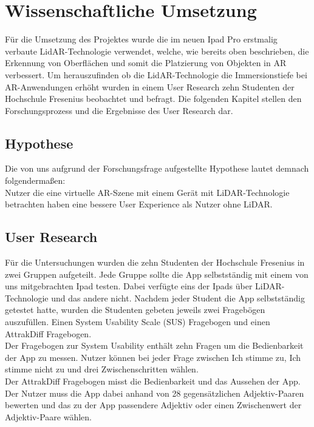\documentclass[titlepage, a4paper, 11pt]{scrartcl}
\begin{document}
  \section{Wissenschaftliche Umsetzung}
  Für die Umsetzung des Projektes wurde die im neuen Ipad Pro erstmalig verbaute LidAR-Technologie verwendet, welche, wie bereits oben beschrieben, die Erkennung von Oberflächen und somit die Platzierung von Objekten in AR verbessert. Um herauszufinden ob die LidAR-Technologie die Immersionstiefe bei AR-Anwendungen erhöht wurden in einem User Research zehn Studenten der Hochschule Fresenius beobachtet und befragt. Die folgenden Kapitel stellen den Forschungsprozess und die Ergebnisse des User Research dar.
  \subsection{Hypothese}
    Die von uns aufgrund der Forschungsfrage aufgestellte Hypothese lautet demnach folgendermaßen:\\

    \glqq Nutzer die eine virtuelle AR-Szene mit einem Gerät mit LiDAR-Technologie betrachten haben eine bessere User Experience als Nutzer ohne LiDAR. \grqq{}

  \subsection{User Research}
    Für die Untersuchungen wurden die zehn Studenten der Hochschule Fresenius in zwei Gruppen aufgeteilt. 
    Jede Gruppe sollte die App selbstständig mit einem von uns mitgebrachten Ipad testen. 
    Dabei verfügte eins der Ipads über LiDAR-Technologie und das andere nicht. 
    Nachdem jeder Student die App selbstständig getestet hatte, wurden die Studenten gebeten jeweils zwei Fragebögen auszufüllen. 
    Einen System Usability Scale (SUS) \cite{SUS} Fragebogen und einen AttrakDiff \cite{AttrakDiff} Fragebogen.\\ 
    Der Fragebogen zur System Usability enthält zehn Fragen um die Bedienbarkeit der App zu messen. 
    Nutzer können bei jeder Frage zwischen \glqq Ich stimme zu\grqq, \glqq Ich stimme nicht zu\grqq{} und drei Zwischenschritten wählen.\\ 
    Der AttrakDiff Fragebogen misst die Bedienbarkeit und das Aussehen der App. 
    Der Nutzer muss die App dabei anhand von 28 gegensätzlichen Adjektiv-Paaren bewerten und das zu der App passendere Adjektiv oder einen Zwischenwert der Adjektiv-Paare wählen.
\end{document}
